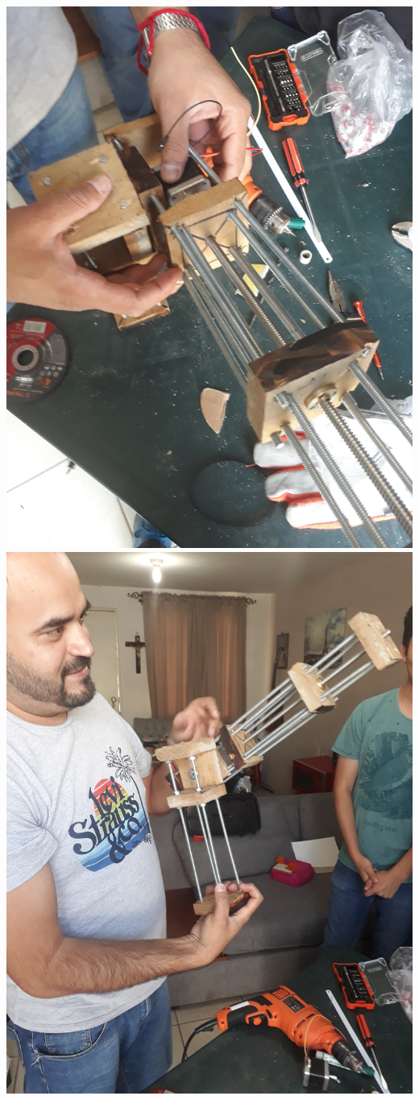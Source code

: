 \documentclass[11pt,a4paper,oldfontcommands,oneside]{memoir}
\begin{document}
\begin{center}
\includegraphics[scale=0.05]{8.jpg} \\
\includegraphics[scale=0.05]{9.jpg} 

\end{center}
\end{document}

